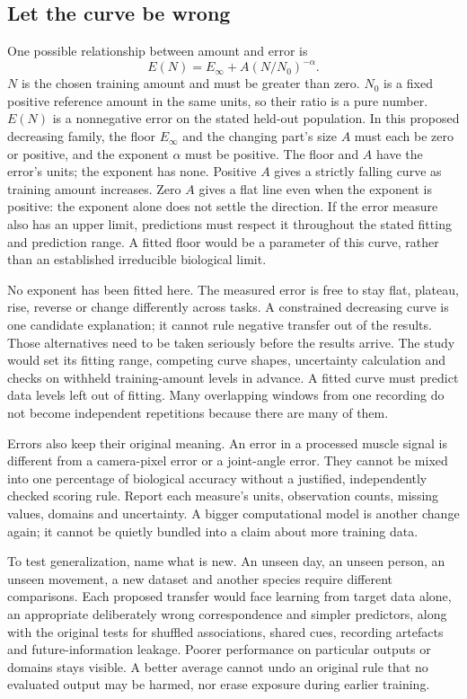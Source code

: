 \subsection{Let the curve be wrong}

One possible relationship between amount and error is
\[
E(N)=E_{\infty}+A(N/N_0)^{-\alpha}.
\]
$N$ is the chosen training amount and must be greater than zero. $N_0$ is a fixed positive reference amount in the same units, so their ratio is a pure number. $E(N)$ is a nonnegative error on the stated held-out population. In this proposed decreasing family, the floor $E_{\infty}$ and the changing part's size $A$ must each be zero or positive, and the exponent $\alpha$ must be positive. The floor and $A$ have the error's units; the exponent has none. Positive $A$ gives a strictly falling curve as training amount increases. Zero $A$ gives a flat line even when the exponent is positive: the exponent alone does not settle the direction. If the error measure also has an upper limit, predictions must respect it throughout the stated fitting and prediction range. A fitted floor would be a parameter of this curve, rather than an established irreducible biological limit.

No exponent has been fitted here. The measured error is free to stay flat, plateau, rise, reverse or change differently across tasks. A constrained decreasing curve is one candidate explanation; it cannot rule negative transfer out of the results. Those alternatives need to be taken seriously before the results arrive. The study would set its fitting range, competing curve shapes, uncertainty calculation and checks on withheld training-amount levels in advance. A fitted curve must predict data levels left out of fitting. Many overlapping windows from one recording do not become independent repetitions because there are many of them.

Errors also keep their original meaning. An error in a processed muscle signal is different from a camera-pixel error or a joint-angle error. They cannot be mixed into one percentage of biological accuracy without a justified, independently checked scoring rule. Report each measure's units, observation counts, missing values, domains and uncertainty. A bigger computational model is another change again; it cannot be quietly bundled into a claim about more training data.

To test generalization, name what is new. An unseen day, an unseen person, an unseen movement, a new dataset and another species require different comparisons. Each proposed transfer would face learning from target data alone, an appropriate deliberately wrong correspondence and simpler predictors, along with the original tests for shuffled associations, shared cues, recording artefacts and future-information leakage. Poorer performance on particular outputs or domains stays visible. A better average cannot undo an original rule that no evaluated output may be harmed, nor erase exposure during earlier training.

